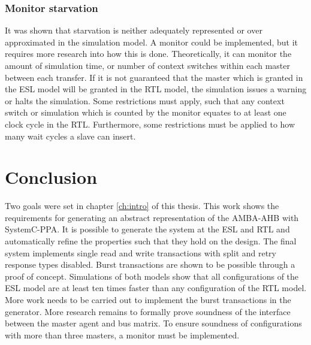 \subsubsection{Monitor starvation}
It was shown that starvation is neither adequately represented or over approximated in the simulation model. A monitor could be implemented, but it requires more research into how this is done. Theoretically, it can monitor the amount of simulation time, or number of context switches within each master between each transfer. If it is not guaranteed that the master which is granted in the ESL model will be granted in the RTL model, the simulation issues a warning or halts the simulation. Some restrictions must apply, such that any context switch or simulation which is counted by the monitor equates to at least one clock cycle in the RTL. Furthermore, some restrictions must be applied to how many wait cycles a slave can insert.    


\section{Conclusion}
\label{sec:concl}
Two goals were set in chapter \ref{ch:intro} of this thesis. This work shows the requirements for generating an abstract representation of the AMBA-AHB with SystemC-PPA. It is possible to generate the system at the ESL and RTL and automatically refine the properties such that they hold on the design. The final system implements single read and write transactions with split and retry response types disabled. Burst transactions are shown to be possible through a proof of concept. Simulations of both models show that all configurations of the ESL model are at least ten times faster than any configuration of the RTL model. More work needs to be carried out to implement the burst transactions in the generator. More research remains to formally prove soundness of the interface between the master agent and bus matrix. To ensure soundness of configurations with more than three masters, a monitor must be implemented.  






     



